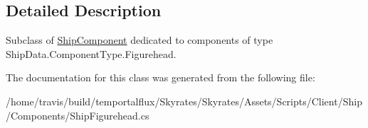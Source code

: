 \subsection{Detailed Description}
Subclass of \hyperlink{class_skyrates_1_1_client_1_1_ship_1_1_ship_component}{Ship\-Component} dedicated to components of type Ship\-Data.\-Component\-Type.\-Figurehead. 



The documentation for this class was generated from the following file\-:\begin{DoxyCompactItemize}
\item 
/home/travis/build/temportalflux/\-Skyrates/\-Skyrates/\-Assets/\-Scripts/\-Client/\-Ship/\-Components/Ship\-Figurehead.\-cs\end{DoxyCompactItemize}
